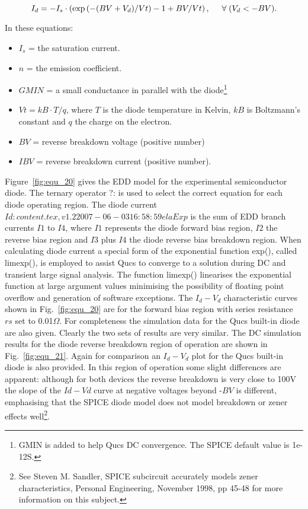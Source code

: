 \begin{equation}
 I_{d} = -I_{s}\cdot \left( \exp\left(-(BV+V_{d})/Vt\right)-1+BV/Vt\right), \hspace{5mm} \forall\; (V_{d } < -BV).
\end{equation} 

\vspace{3mm}

In these equations:
\begin{itemize}
 \item $I_{s}$ = the saturation current.
 \item $n$ = the emission coefficient.
 \item $GMIN$ = a small conductance in parallel with the diode\footnote{GMIN is added to help Qucs DC convergence. The SPICE default value is 1e-12S.}
 \item $Vt = kB\cdot T/q$, where $T$ is the diode temperature in Kelvin, $kB$ is Boltzmann's constant and $q$ the charge on the electron.
 \item $BV$ = reverse breakdown voltage (positive number) 
 \item $IBV$ = reverse breakdown current (positive number).
\end{itemize}

Figure~\ref{fig:equ_20} gives the EDD model for the experimental
semiconductor diode. The ternary operator ?: is used to select the
correct equation for each diode operating region. The diode current $Id: content.tex,v 1.2 2007-06-03 16:58:59 ela Exp $
is the sum of EDD branch currents $I1$ to $I4$, where $I1$ represents the
diode forward bias region, $I2$ the reverse bias region and $I3$ plus $I4$
the diode reverse bias breakdown region. When calculating diode
current a special form of the exponential function exp(), called
limexp(), is employed to assist Qucs to converge to a solution during
DC and transient large signal analysis. The function limexp()
linearises the exponential function at large argument values
minimising the possibility of floating point overflow and generation
of software exceptions. The $I_{d}-V_{d}$ characteristic curves shown
in Fig.~\ref{fig:equ_20} are for the forward bias region with series
resistance $rs$ set to 0.01$\Omega$. For completeness the simulation
data for the Qucs built-in diode are also given. Clearly the two sets
of results are very similar. The DC simulation results for the diode
reverse breakdown region of operation are shown in
Fig.~\ref{fig:equ_21}. Again for comparison an $I_{d}-V_{d}$ plot for
the Qucs built-in diode is also provided. In this region of operation
some slight differences are apparent: although for both devices the
reverse breakdown is very close to 100V the slope of the $Id-Vd$ curve
at negative voltages beyond -$BV$ is different, emphasising that the
SPICE diode model does not model breakdown or zener effects
well\footnote{See Steven M. Sandler, SPICE subcircuit accurately
models zener characteristics, Personal Engineering, November 1998, pp
45-48 for more information on this subject.}.

